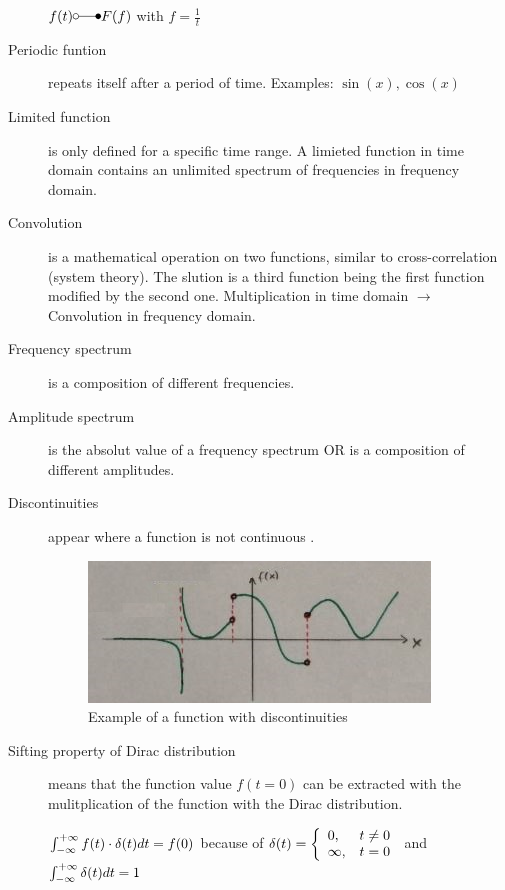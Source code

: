 \begin{description}
	$f(t) \laplace F(f)$ with $f=\frac{1}{t}$
	
	\item[Periodic funtion] repeats itself after a period of time. Examples: $\sin(x),\cos(x)$
	\item[Limited function] is only defined for a specific time range. A limieted function in time domain contains an unlimited spectrum of frequencies in frequency domain. 
	\item[Convolution] is a mathematical operation on two functions, similar to cross-correlation (system theory). The slution is a third function being the first function modified by the second one. Multiplication in time domain $\rightarrow$ Convolution in frequency domain.
	\item[Frequency spectrum] is a composition of different frequencies.
	\item[Amplitude spectrum] is the absolut value of a frequency spectrum OR is a composition of different amplitudes.
	\item[Discontinuities] appear where a function is not continuous .
		\begin{figure}
			\centering
			\includegraphics[width=0.7\linewidth]{images/discontinu}
			\caption{Example of a function with discontinuities}
			\label{fig:discontinu}
		\end{figure}
	

	\item[Sifting property of Dirac distribution] means that the function value $f(t=0)$ can be extracted with the mulitplication of the function with the Dirac distribution.
	
	
	$\int_{-\infty}^{+\infty} f(t) \cdot \delta(t) dt = f(0) $ because of 
	$ \delta(t)=\left\{\begin{array}{ll} 0,&t \neq 0 \\
	\infty,&t = 0\end{array}\right. $	and $\int_{-\infty}^{+\infty}\delta(t) dt = 1 $
	

\end{description}
